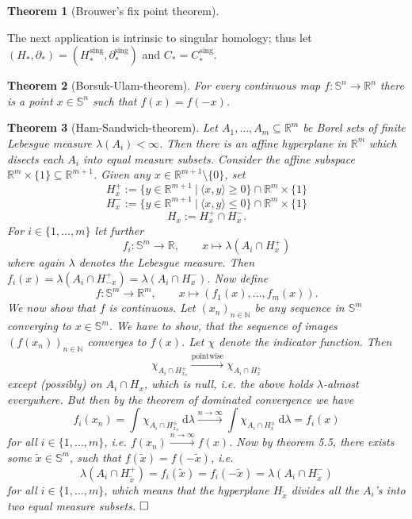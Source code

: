\documentclass[11pt]{book}
\numberwithin{dummy}{section}
\newtheorem{theorem}{Theorem}[section]
\theoremstyle{nonumberbreak}
\newenvironment{pr}[1][]{\ifthenelse{\equal{#1}{}}{\proof}{\proof[#1]}\rm}{\endproof}
\newcommand{\Sph}{\mathbb{S}}
\newcommand{\la}{\longrightarrow}
\newcommand{\Cs}{C^{\hspace{1pt}\mathrm{sing}}}
\newcommand{\Hs}{H^{\hspace{1pt}\mathrm{sing}}}
\begin{document}
\begin{spacing}{1.4}
\begin{theorem}[Brouwer's fix point theorem]
\begin{pr}
\end{pr}
\end{theorem}


The next application is intrinsic to singular homology; thus let $(H_*, \partial_*) = (\Hs_*, \partial^{\mathrm{sing}}_*)$ and $C_*=\Cs_*$.


\begin{theorem}[Borsuk-Ulam-theorem]
For every continuous map $f: \Sph^n \la \mathbb{R}^{n}$ there is a point $x \in \Sph^n$ such that $f(x) = f(-x)$.
\end{theorem}


\begin{theorem}[Ham-Sandwich-theorem]
Let $A_1, \ldots, A_m \subseteq \mathbb{R}^m$ be Borel sets of finite Lebesgue measure $\lambda(A_i) < \infty$. Then there is an affine hyperplane in $\mathbb{R}^m$ which disects each $A_i$ into equal measure subsets. 
\begin{pr}
Consider the affine subspace $\mathbb{R}^m \times \{1\} \subseteq \mathbb{R}^{m+1}$. Given any $x \in \mathbb{R}^{m+1} \setminus \{0\}$, set
$$H_x^+ := \{ y \in \mathbb{R}^{m+1} \ \vert \ \langle x,y\rangle \geqslant 0 \} \cap \mathbb{R}^m \times \{1\}$$
$$H_x^- := \{ y \in \mathbb{R}^{m+1} \ \vert \ \langle x,y\rangle \leqslant 0 \} \cap \mathbb{R}^m \times \{1\}$$
$$H_x:= H_x^+ \cap H_x^-.$$
For $i \in \{1,\ldots, m\}$ let further 
$$f_i: \Sph^m \la \mathbb{R}, \qquad x  \mapsto \lambda \left( A_i \cap H_x^+\right)$$
where again $\lambda$ denotes the Lebesgue measure. Then $f_i(x) = \lambda(A_i \cap H_{-x}^+) = \lambda(A_i \cap H_x^-)$. Now define
$$f: \Sph^m \la \mathbb{R}^m, \qquad x \mapsto (f_1(x), \ldots, f_m(x)).$$
We now show that $f$ is continuous. Let $(x_n)_{n \in \mathbb{N}}$ be any sequence in $\Sph^m$ converging to $x \in \Sph^m$. We have to show, that the sequence of images $(f(x_n))_{n \in \mathbb{N}}$ converges to $f(x)$. Let $\chi$ denote the indicator function. Then
$$\chi_{A_i \cap H_{x_n}^{\pm}} \xrightarrow{\mathrm{pointwise}} \chi_{A_i \cap H_x^{\pm}}$$
except (possibly) on $A_i \cap H_x$, which is null, i.e. the above holds $\lambda$-almost everywhere. But then by the theorem of dominated convergence we have
$$f_i(x_n) = \int \chi_{A_i \cap H_{x_n}^{\pm}} \ \mathrm{d} \lambda \xrightarrow{n \to \infty} \int \chi_{A_i \cap H_x^{\pm}} \ \mathrm{d}\lambda = f_i(x)$$
for all $i \in \{1, \ldots, m\}$, i.e. $f(x_n) \xrightarrow{n \to \infty} f(x)$. 
Now by theorem 5.5, there exists some $\tilde{x} \in \Sph^m$, such that $f(\tilde{x})=f(-\tilde{x})$, i.e.
$$\lambda(A_i \cap  H_{\tilde{x}}^+) = f_i(\tilde{x}) = f_i(-\tilde{x}) = \lambda(A_i \cap H_{\tilde{x}}^-)$$
for all $i \in \{1,\ldots, m\}$, which means that the hyperplane $H_{\tilde{x}}$ divides all the $A_i$'s into two equal measure subsets. $\hfill \Box$
\end{pr}
\end{theorem}




\end{spacing}
\end{document}
